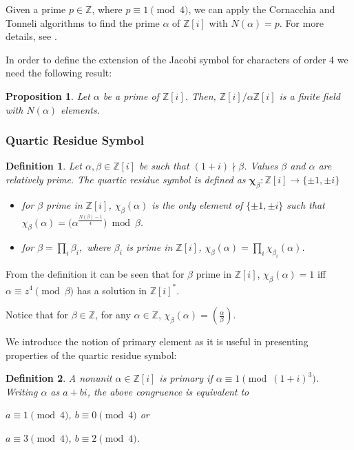 \documentclass[11pt, a4paper, twoside, openright]{report}
\newtheorem{proposition}{Proposition}
\newtheorem{definition}{Definition}
\begin{document}
 			Given a prime $p \in \mathbb{Z}$, where $p \equiv 1 \pmod{4}$, we can apply the Cornacchia and Tonneli algorithms to find the prime 
 		 		$\alpha$ of $\mathbb{Z}[i]$ with $N(\alpha)=p$. For more details, see \cite{cohen}.
 		
 		In order to define the extension of the Jacobi symbol for characters of order 4 we need the following result:
 		
 		\begin{proposition}
 		Let $\alpha$ be a prime of $\mathbb{Z}[i]$. Then, $\mathbb{Z}[i]/\alpha\mathbb{Z}[i]$ is a finite field with
 		$N(\alpha)$ elements.
 		\end{proposition}
 		
 		\subsubsection{Quartic Residue Symbol}
 		
 			\begin{definition}
 				Let $\alpha,\beta \in \mathbb{Z}[{i}]$ be such that $(1+i) \nmid \beta$. Values $\beta$ and $\alpha$ are relatively prime.  
 				The quartic residue symbol is defined as $ 
 				 \mathbf{\chi}_{\beta} : \mathbb{Z}[{i}] \to \{\pm 1, \pm i\}$ 
 				\begin{itemize}
 					\item for $\beta$ prime in $\mathbb{Z}[i]$, $\chi_{\beta}(\alpha)$ is the only element of $\{\pm 1, \pm i\}$ such that 
 					$\chi_{\beta}(\alpha)= (\alpha^{\frac{N(\beta)-1}{4}}\big)\bmod \beta$.
 					\item for $\beta = \prod _ {i} \beta _{i},$ where $\beta_{i}$ is prime in $\mathbb{Z}[i]$, $\chi_{\beta}(\alpha)= \prod_i{\chi_{\beta _{i}}(\alpha)}$. 
 				\end{itemize} 
 				  
 			\end{definition}
 			
 			From the definition it can be seen that for $\beta$ prime in $\mathbb{Z}[i]$, $\chi_{\beta}(\alpha) =1$ 
 			iff $\alpha \equiv z^4 \pmod{\beta}$ has a solution in $\mathbb{Z}[i]^*$.
 			
 			Notice that for $\beta \in \mathbb{Z}$, for any $\alpha \in \mathbb{Z}$, $\chi_{\beta}(\alpha) = (\frac{\alpha}{\beta})$. 
 			
 			We introduce the notion of primary element as it is useful in presenting properties of the quartic residue symbol:
 			
 			\begin{definition}
 				A nonunit $\alpha \in \mathbb{Z}[i]$ is primary if $\alpha \equiv 1 \pmod{(1+i)^3}$. Writing $\alpha$ as
 				$a + bi$, the above congruence is equivalent to 
 				
 				\hspace{30mm} $a \equiv 1 \pmod{4}$, $b \equiv 0 \pmod{4}$ or  
 				
 				\hspace{30mm} $a \equiv 3 \pmod{4}$, $b \equiv 2 \pmod{4}$.  				
 			\end{definition}
 		
\end{document}
